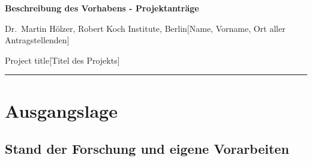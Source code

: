 \documentclass[ngerman]{scrartcl}
\newcommand{\applicants}{Dr.\ Martin H\"olzer, Robert Koch Institute, Berlin}
\newcommand{\project}{Project title}
\begin{document}
\pagestyle{empty}
\setcounter{page}{1}

%

\cleardoublepage
\pagestyle{plain}


{\raggedright{} \normalsize \bfseries 
	Beschreibung des Vorhabens - Projektanträge \par
	\applicants{[Name, Vorname, Ort aller Antragstellenden]} \par
	\project{[Titel des Projekts]} \par
	\rule{\textwidth}{0.5pt} \par
}

\section{Ausgangslage}
\label{sec:work-report}

\subsection{Stand der Forschung und eigene Vorarbeiten}
\end{document}
